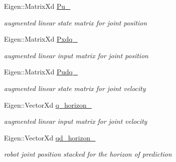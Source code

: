 \begin{DoxyCompactItemize}
\mbox{\label{structrobot_1_1_m_p_c__param_a8be71f746cbd0abef5804b600b186a0c}} 
Eigen\+::\+Matrix\+Xd \hyperlink{structrobot_1_1_m_p_c__param_a8be71f746cbd0abef5804b600b186a0c}{Pu\+\_\+}
\begin{DoxyCompactList}\small\item\em augmented linear state matrix for joint position \end{DoxyCompactList}\item 
\mbox{\label{structrobot_1_1_m_p_c__param_a81408273f0e0f8d59c587b1bb93de730}} 
Eigen\+::\+Matrix\+Xd \hyperlink{structrobot_1_1_m_p_c__param_a81408273f0e0f8d59c587b1bb93de730}{Pxdq\+\_\+}
\begin{DoxyCompactList}\small\item\em augmented linear input matrix for joint position \end{DoxyCompactList}\item 
\mbox{\label{structrobot_1_1_m_p_c__param_a752511aecb715b74d5d2e141acd59d78}} 
Eigen\+::\+Matrix\+Xd \hyperlink{structrobot_1_1_m_p_c__param_a752511aecb715b74d5d2e141acd59d78}{Pudq\+\_\+}
\begin{DoxyCompactList}\small\item\em augmented linear state matrix for joint velocity \end{DoxyCompactList}\item 
\mbox{\label{structrobot_1_1_m_p_c__param_af59504f6a845d78f9752a372087392dd}} 
Eigen\+::\+Vector\+Xd \hyperlink{structrobot_1_1_m_p_c__param_af59504f6a845d78f9752a372087392dd}{q\+\_\+horizon\+\_\+}
\begin{DoxyCompactList}\small\item\em augmented linear input matrix for joint velocity \end{DoxyCompactList}\item 
\mbox{\label{structrobot_1_1_m_p_c__param_a3807f25f31e9aac28efe5dbbc397a9e9}} 
Eigen\+::\+Vector\+Xd \hyperlink{structrobot_1_1_m_p_c__param_a3807f25f31e9aac28efe5dbbc397a9e9}{qd\+\_\+horizon\+\_\+}
\begin{DoxyCompactList}\small\item\em robot joint position stacked for the horizon of prediction \end{DoxyCompactList}\item 

\end{DoxyCompactItemize}
